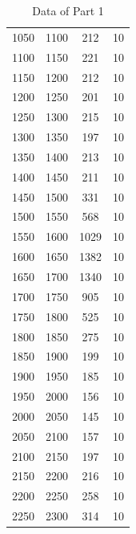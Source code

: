 \documentclass[11pt,a4paper,notitlepage]{scrartcl}
\begin{document}
\begin{table}[H]
\begin{tabular}{c|c|c|c}
		{1050}              & 1100                       & 212             & 10           \\
		{1100}              & 1150                       & 221             & 10           \\
		{1150}              & 1200                       & 212             & 10           \\
		{1200}              & 1250                       & 201             & 10           \\
		{1250}              & 1300                       & 215             & 10           \\
		{1300}              & 1350                       & 197             & 10           \\
		{1350}              & 1400                       & 213             & 10           \\
		{1400}              & 1450                       & 211             & 10           \\
		{1450}              & 1500                       & 331             & 10           \\
		{1500}              & 1550                       & 568             & 10           \\
		{1550}              & 1600                       & 1029            & 10           \\
		{1600}              & 1650                       & 1382            & 10           \\
		{1650}              & 1700                       & 1340            & 10           \\
		{1700}              & 1750                       & 905             & 10           \\
		{1750}              & 1800                       & 525             & 10           \\
		{1800}              & 1850                       & 275             & 10           \\
		{1850}              & 1900                       & 199             & 10           \\
		{1900}              & 1950                       & 185             & 10           \\
		{1950}              & 2000                       & 156             & 10           \\
		{2000}              & 2050                       & 145             & 10           \\
		{2050}              & 2100                       & 157             & 10           \\
		{2100}              & 2150                       & 197             & 10           \\
		{2150}              & 2200                       & 216             & 10           \\
		{2200}              & 2250                       & 258             & 10           \\
		{2250}              & 2300                       & 314             & 10           \\
	\end{tabular}
	\caption{Data of Part 1}
\end{table}
\end{document}
